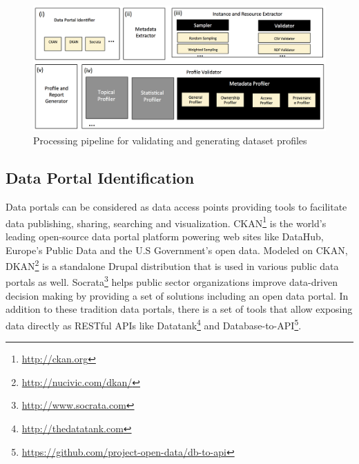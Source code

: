 \documentclass[runningheads,a4paper]{llncs}
\begin{document}
\begin{figure}[!ht]
  \centering
  \includegraphics[scale=0.4]{figure-1_architecture.png}
  \caption{Processing pipeline for validating and generating dataset profiles}
  \label{fig:Roomba_architecture}
\end{figure}

\subsection{Data Portal Identification}
Data portals can be considered as data access points providing tools to facilitate data publishing, sharing, searching and visualization. CKAN\footnote{\url{http://ckan.org}} is the world's leading open-source data portal platform powering web sites like DataHub, Europe's Public Data and the U.S Government's open data. Modeled on CKAN, DKAN\footnote{\url{http://nucivic.com/dkan/}} is a standalone Drupal distribution that is used in various public data portals as well. Socrata\footnote{\url{http://www.socrata.com}} helps public sector organizations improve data-driven decision making by providing a set of solutions including an open data portal. In addition to these tradition data portals, there is a set of tools that allow exposing data directly as RESTful APIs like Datatank\footnote{\url{http://thedatatank.com}} and Database-to-API\footnote{\url{https://github.com/project-open-data/db-to-api}}.
\end{document}

